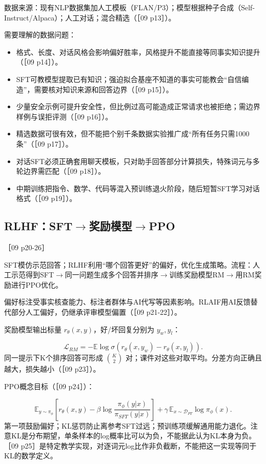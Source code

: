 \documentclass[UTF8,a4paper,zihao=-4,fontset=windows]{ctexart}
\newcommand{\source}[1]{{\small #1}\par}
\begin{document}
数据来源：现有NLP数据集加人工模板（FLAN/\allowbreak{}P3）；模型根据种子合成（Self-Instruct/\allowbreak{}Alpaca）；人工对话；混合精选（［09 p13］）。

需要理解的数据问题：

\begin{itemize}
\item {}格式、长度、对话风格会影响偏好胜率，风格提升不能直接等同事实知识提升（［09 p14］）。
\item {}SFT可教模型提取已有知识；强迫拟合基座不知道的事实可能教会“自信编造”，需要核对知识来源和回答边界（［09 p15］）。
\item {}少量安全示例可提升安全性，但比例过高可能造成正常请求也被拒绝；需边界样例与误拒评测（［09 p16］）。
\item {}精选数据可很有效，但不能把个别千条数据实验推广成“所有任务只需1000条”（［09 p17］）。
\item {}对话SFT必须正确套用聊天模板，只对助手回答部分计算损失，特殊词元与多轮边界需匹配（［09 p18］）。
\item {}中期训练把指令、数学、代码等混入预训练退火阶段，随后短暂SFT学习对话格式（［09 p19］）。
\end{itemize}
\subsection{RLHF：SFT\ensuremath{\rightarrow}奖励模型\ensuremath{\rightarrow}PPO}
\source{［09 p20-26］}
SFT模仿示范回答；RLHF利用“哪个回答更好”的偏好，优化生成策略。流程：人工示范得到SFT\ensuremath{\rightarrow}同一问题生成多个回答并排序\ensuremath{\rightarrow}训练奖励模型RM\ensuremath{\rightarrow}用RM奖励进行PPO优化。

偏好标注受事实核查能力、标注者群体与AI代写等因素影响。RLAIF用AI反馈替代部分人工偏好，仍继承评审模型偏置（［09 p21-22］）。

奖励模型输出标量 $r_\theta(x,y)$，好/\allowbreak{}坏回复分别为 $y_w,y_l$：

\[\mathcal L_{RM}=-\mathbb E\log\sigma(r_\theta(x,y_w)-r_\theta(x,y_l)).\]
同一提示下K个排序回答可形成 $\binom K2$ 对；课件对这些对取平均。分差方向正确且越大，损失越小（［09 p23］）。

PPO概念目标（［09 p24］）：

\[\mathbb E_{y\sim\pi_\phi}[r_\theta(x,y)-\beta\log\frac{\pi_\phi(y|x)}{\pi_{SFT}(y|x)}] +\gamma\,\mathbb E_{x\sim\mathcal D_{PT}}\log\pi_\phi(x).\]
第一项鼓励偏好；KL惩罚防止离参考SFT过远；预训练项缓解通用能力退化。注意KL是分布期望，单条样本的log概率比可以为负，不能据此认为KL本身为负。［09 p25］是特定教学实现，对逐词元log比作非负截断，不能把这一实现等同于KL的数学定义。
\end{document}
